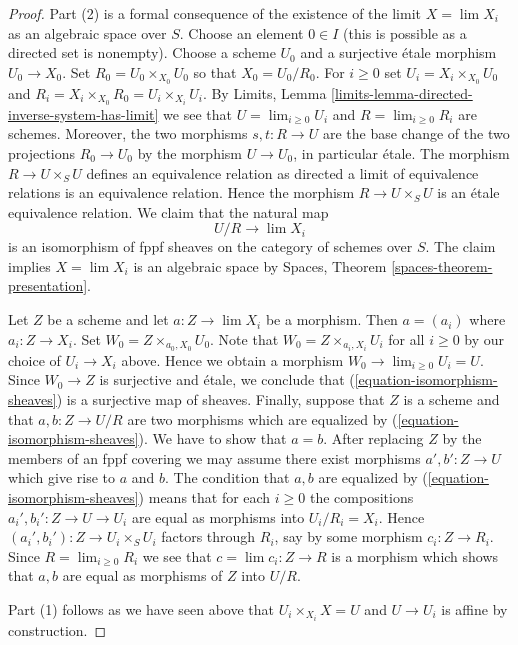 \begin{proof}
Part (2) is a formal consequence of the existence of the
limit $X = \lim X_i$ as an algebraic space over $S$.
Choose an element $0 \in I$ (this is possible as a directed set is nonempty).
Choose a scheme $U_0$ and a surjective
\'etale morphism $U_0 \to X_0$. Set $R_0 = U_0 \times_{X_0} U_0$
so that $X_0 = U_0/R_0$. For $i \geq 0$ set
$U_i = X_i \times_{X_0} U_0$ and
$R_i = X_i \times_{X_0} R_0 = U_i \times_{X_i} U_i$.
By Limits, Lemma \ref{limits-lemma-directed-inverse-system-has-limit}
we see that $U = \lim_{i \geq 0} U_i$ and $R = \lim_{i \geq 0} R_i$
are schemes. Moreover, the two morphisms $s, t : R \to U$ are the base
change of the two projections $R_0 \to U_0$ by the morphism
$U \to U_0$, in particular \'etale. The morphism $R \to U \times_S U$
defines an equivalence relation as directed a limit of equivalence relations
is an equivalence relation. Hence the morphism
$R \to U \times_S U$ is an \'etale equivalence relation. We claim that
the natural map
\begin{equation}
\label{equation-isomorphism-sheaves}
U/R \longrightarrow \lim X_i
\end{equation}
is an isomorphism of fppf sheaves on the category of schemes over $S$.
The claim implies $X = \lim X_i$ is an algebraic
space by Spaces, Theorem \ref{spaces-theorem-presentation}.

\medskip\noindent
Let $Z$ be a scheme and let $a : Z \to \lim X_i$ be a morphism.
Then $a = (a_i)$ where $a_i : Z \to X_i$. Set $W_0 = Z \times_{a_0, X_0} U_0$.
Note that $W_0 = Z \times_{a_i, X_i} U_i$ for all $i \geq 0$ by our
choice of $U_i \to X_i$ above. Hence we obtain a morphism
$W_0 \to \lim_{i \geq 0} U_i = U$. Since $W_0 \to Z$ is surjective
and \'etale, we conclude that (\ref{equation-isomorphism-sheaves})
is a surjective map of sheaves. Finally, suppose that
$Z$ is a scheme and that $a, b : Z \to U/R$ are two morphisms
which are equalized by (\ref{equation-isomorphism-sheaves}).
We have to show that $a = b$.
After replacing $Z$ by the members of an fppf covering
we may assume there exist morphisms $a', b' : Z \to U$ which
give rise to $a$ and $b$. The condition that $a, b$ are
equalized by (\ref{equation-isomorphism-sheaves}) means that
for each $i \geq 0$ the compositions $a_i', b_i' : Z \to U \to U_i$
are equal as morphisms into $U_i/R_i = X_i$. Hence
$(a_i', b_i') : Z \to U_i \times_S U_i$ factors through
$R_i$, say by some morphism $c_i : Z \to R_i$. Since
$R = \lim_{i \geq 0} R_i$ we see that $c = \lim c_i : Z \to R$
is a morphism which shows that $a, b$ are equal as morphisms
of $Z$ into $U/R$.

\medskip\noindent
Part (1) follows as we have seen above that
$U_i \times_{X_i} X = U$ and $U \to U_i$ is affine by
construction.
\end{proof}

